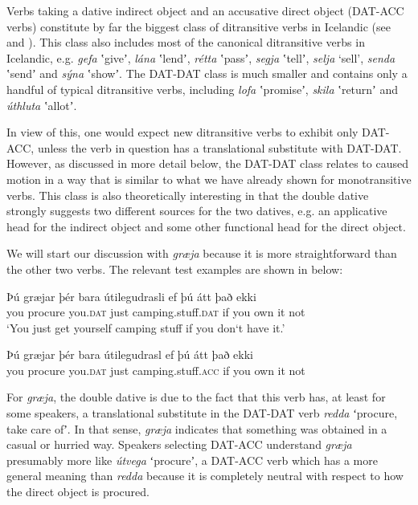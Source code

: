 \documentclass[output=paper,modfonts,nonflat,colorlinks,citecolor=brown]{langsci/langscibook}
\begin{document}
Verbs taking a dative indirect object and an accusative direct object (DAT-ACC verbs) constitute by far the biggest class of ditransitive verbs in Icelandic (see \citealt{ZaenenMalingThráinsson1985} and \citealt{Jónsson2000}). This class also includes most of the canonical ditransitive verbs in Icelandic, e.g. \textit{gefa} ʽgiveʼ, \textit{lána} ʽlendʼ, \textit{rétta} ʽpassʼ, \textit{segja} ʽtellʼ, \textit{selja} ‘sell’, \textit{senda} ʽsendʼ and \textit{sýna} ʽshowʼ. The DAT-DAT class is much smaller and contains only a handful of typical ditransitive verbs, including \textit{lofa} ʽpromiseʼ, \textit{skila} ʽreturnʼ and \textit{úthluta} ʽallotʼ. 

In view of this, one would expect new ditransitive verbs to exhibit only DAT-ACC, unless the verb in question has a translational substitute with DAT-DAT. However, as discussed in more detail below, the DAT-DAT class relates to caused motion in a way that is similar to what we have already shown for monotransitive verbs. This class is also theoretically interesting in that the double dative strongly suggests two different sources for the two datives, e.g. an applicative head for the indirect object and some other functional head for the direct object. 

We will start our discussion with \textit{græja} because it is more straightforward than the other two verbs. The relevant test examples are shown in  below:

 
\ea%
    \label{ex:jonsson:9}  
\ea
\gll  Þú  græjar  þér  bara  útilegudrasli  ef  þú  átt  það  ekki\\
   you  procure  you.\textsc{dat}  just  camping.stuff.\textsc{dat}  if  you  own  it  not\\
\glt `You just get yourself camping stuff if you don‘t have it.'
 
 
\ex
\gll   Þú  græjar  þér  bara  útilegudrasl  ef  þú  átt  það  ekki\\
 you  procure  you.\textsc{dat}  just  camping.stuff.\textsc{acc}  if  you  own  it  not\\
\z
\z

For \textit{græja}, the double dative is due to the fact that this verb has, at least for some speakers, a translational substitute in the DAT-DAT verb \textit{redda} ʻprocure, take care ofʼ. In that sense, \textit{græja} indicates that something was obtained in a casual or hurried way. Speakers selecting DAT-ACC understand \textit{græja} presumably more like \textit{útvega} ʻprocureʼ, a DAT-ACC verb which has a more general meaning than \textit{redda} because it is completely neutral with respect to how the direct object is procured.
\end{document}
